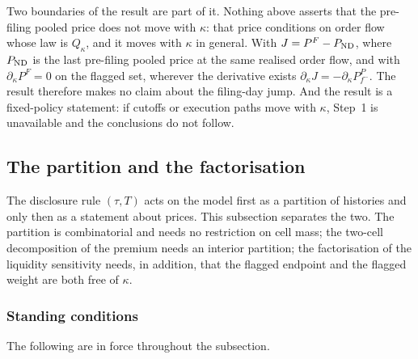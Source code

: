 Two boundaries of the result are part of it. Nothing above asserts that the pre-filing pooled price
does not move with $\kappa$: that price conditions on order flow whose law is $Q_\kappa$, and it
moves with $\kappa$ in general. With $J=P^F-P_{\mathrm{ND}}$, where $P_{\mathrm{ND}}$ is the last pre-filing pooled
price at the same realised order flow, and with $\partial_\kappa P^F=0$ on the flagged set, wherever
the derivative exists $\partial_\kappa J=-\partial_\kappa P_{f^-}^P$. The result therefore makes no
claim about the filing-day jump. And the result is a fixed-policy statement: if cutoffs or execution
paths move with $\kappa$, Step~1 is unavailable and the conclusions do not follow.


\providecommand{\Prb}{\mathbb{P}}
\providecommand{\Eop}{\mathbb{E}}
\providecommand{\ind}{\mathbf{1}}
\providecommand{\Dact}{\Delta_{\mathrm{act}}}

\subsection{The partition and the factorisation}
\label{sec:partition-factorisation}

The disclosure rule $(\tau,T)$ acts on the model first as a partition of histories and only then as
a statement about prices. This subsection separates the two. The partition is combinatorial and
needs no restriction on cell mass; the two-cell decomposition of the premium needs an interior
partition; the factorisation of the liquidity sensitivity needs, in addition, that the flagged
endpoint and the flagged weight are both free of $\kappa$.

\subsubsection*{Standing conditions}

The following are in force throughout the subsection.

